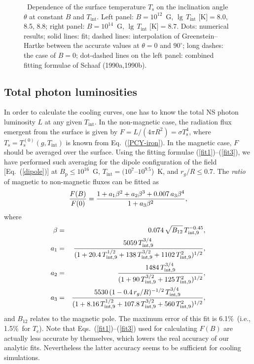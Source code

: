 \documentclass{aa}
\begin{document}
\begin{figure}
\centering
\sidecaption
\epsfxsize=12cm
\caption{~Dependence of the surface temperature $T_\mathrm{s}$ 
on the inclination angle $\theta$ at constant $B$ and $T_\mathrm{int}$.
Left panel: $B=10^{12}$~G, $\lg\,T_\mathrm{int}\mbox{ [K]}=8.0$, 8.5, 8.8;
right panel: $B=10^{14}$~G, $\lg\,T_\mathrm{int}\mbox{ [K]}=8.7$.
Dots: numerical results; solid lines: fit;
dashed lines: interpolation of Greenstein--Hartke
between the accurate values at $\theta=0$ and $90^\circ$;
long dashes: the case of $B=0$; dot-dashed lines on the left panel:
combined fitting formulae of Schaaf (1990a,1990b).
}
\label{fig-tdistr}
\end{figure}

\subsection{Total photon luminosities}
%
In order to calculate the cooling curves,
one has to know the total NS photon luminosity $L$
at any given $T_\mathrm{int}$. In the non-magnetic case,
the radiation flux emergent from the surface
is given by $F=L/(4 \pi R^2)=\sigma T_\mathrm{s}^4$,
where $T_\mathrm{s} = T_\mathrm{s}^{(0)}(g,T_\mathrm{int})$ 
is known from Eq.~(\ref{PCY-iron}).
In the magnetic case, $F$ should be averaged
over the surface. Using the fitting formulae
(\ref{fit1})--(\ref{fit3}), we have performed such averaging
for the dipole configuration of the field
[Eq.~(\ref{dipole})] at $B_\mathrm{p}\leq10^{16}$~G,
$T_\mathrm{int}=(10^7$--$10^{9.5}$)~K, and $r_g/R\leq0.7$.
The \emph{ratio} of magnetic to non-magnetic fluxes
can be fitted as
%
\begin{equation}
  {F(B)\over F(0)} = {1 + a_1 \beta^2 + a_2 \beta^3
   + 0.007 \, a_3 \beta^4
       \over
         1 + a_3 \beta^2},
\label{fit-F}
\end{equation}
%
where
%
\begin{eqnarray}
    \beta &=&  0.074 \,\sqrt{B_{12}} \,T_\mathrm{int,9}^{-0.45},
 \nonumber\\
    a_1 &=& {5059 \,T_\mathrm{int,9}^{3/4}
            \over
      (1 + 20.4 \,T_\mathrm{int,9}^{1/2}
       + 138 \,T_\mathrm{int,9}^{3/2}
       + 1102 \,T_\mathrm{int,9}^2)^{1/2} },
 \nonumber\\
    a_2 &=& {1484 \, T_\mathrm{int,9}^{3/4}
            \over
      (1 + 90\,T_\mathrm{int,9}^{3/2}
       + 125 \,T_\mathrm{int,9}^2 )^{1/2} },
 \nonumber\\
    a_3 &=& {5530 \,(1 - 0.4 \,r_g/R)^{-1/2}
     \,T_\mathrm{int,9}^{3/4} 
            \over
 (1 + 8.16 \,T_\mathrm{int,9}^{1/2}
 + 107.8 \, T_\mathrm{int,9}^{3/2}
 + 560 \,T_\mathrm{int,9}^2)^{1/2} },
\nonumber
\end{eqnarray}
%
and $B_{12}$ relates to the magnetic pole.
The maximum error of this fit is 6.1\%\ (i.e., 1.5\%\ for
$T_\mathrm{e}$). Note that 
Eqs.~(\ref{fit1})--(\ref{fit3})
used for calculating $F(B)$
are actually less accurate by themselves, which lowers the
real accuracy of our analytic fits. Nevertheless the 
latter accuracy 
seems to be sufficient for cooling simulations.
\end{document}
